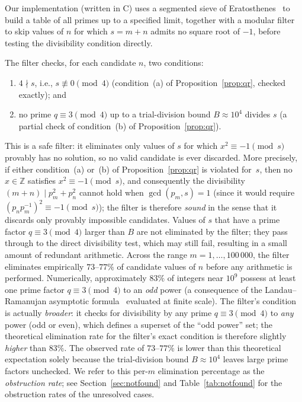 \documentclass[12pt]{article}
\begin{document}
	Our implementation (written in C) uses a segmented sieve of
	Eratosthenes~\cite{CrandallPomerance} to build a table of all primes up
	to a specified limit, together with a modular filter to skip values of
	$n$ for which $s = m + n$ admits no square root of $-1$, before testing
	the divisibility condition directly.
	
	The filter checks, for each candidate $n$, two conditions:
	\begin{enumerate}
		\item[(a)] $4 \nmid s$, i.e., $s \not\equiv 0 \pmod{4}$
		(condition~(a) of Proposition~\ref{prop:qr}, checked exactly); and
		\item[(b$'$)] no prime $q \equiv 3 \pmod{4}$ up to a trial-division
		bound $B \approx 10^4$ divides $s$ (a partial check of
		condition~(b) of Proposition~\ref{prop:qr}).
	\end{enumerate}
	This is a safe filter: it eliminates only values of $s$ for which
	$x^2 \equiv -1 \pmod{s}$ provably has no solution, so no valid
	candidate is ever discarded.
	More precisely, if either condition~(a) or~(b) of
	Proposition~\ref{prop:qr} is violated for~$s$, then no
	$x \in \mathbb{Z}$ satisfies $x^2 \equiv -1 \pmod{s}$, and
	consequently the divisibility $(m+n) \mid p_m^2 + p_n^2$ cannot hold
	when $\gcd(p_m, s) = 1$ (since it would require
	$(p_n p_m^{-1})^2 \equiv -1 \pmod{s}$); the filter is therefore
	\emph{sound} in the sense that it discards only provably impossible
	candidates.
	Values of $s$ that have a prime factor $q \equiv 3 \pmod{4}$ larger
	than $B$ are not eliminated by the filter; they pass through to the
	direct divisibility test, which may still fail, resulting in a small
	amount of redundant arithmetic.
	Across the range $m = 1, \ldots, 100\,000$, the filter eliminates
	empirically $73$--$77\%$ of candidate values of $n$ before any
	arithmetic is performed.
	Numerically, approximately $83\%$ of integers near $10^9$ possess at
	least one prime factor $q \equiv 3 \pmod{4}$ to an \emph{odd} power
	(a consequence of the Landau--Ramanujan asymptotic
	formula~\cite{Landau1908} evaluated at finite scale).
	The filter's condition is actually \emph{broader}: it checks for
	divisibility by any prime $q \equiv 3 \pmod{4}$ to \emph{any} power
	(odd or even), which defines a superset of the ``odd power'' set;
	the theoretical elimination rate for the filter's exact condition is
	therefore slightly \emph{higher} than $83\%$.
	The observed rate of $73$--$77\%$ is lower than this theoretical
	expectation solely because the trial-division bound $B \approx 10^4$
	leaves large prime factors unchecked.
	We refer to this per-$m$ elimination percentage as the
	\emph{obstruction rate}; see Section~\ref{sec:notfound}
	and Table~\ref{tab:notfound} for the obstruction rates of the
	unresolved cases.
	
\end{document}
